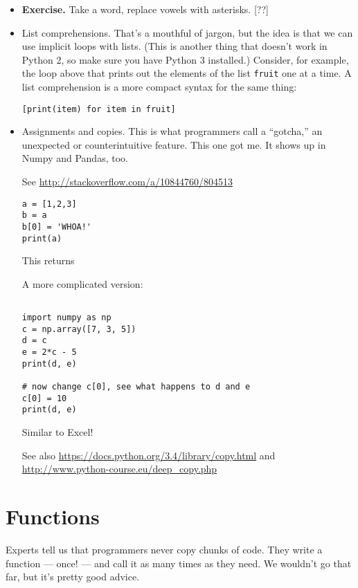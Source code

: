 \documentclass[11pt]{article}
\begin{document}
\begin{itemize}


\item {\bf Exercise.}
Take a word, replace vowels with asterisks. [??]


\item List comprehensions.
That's a mouthful of jargon, but the idea is that we can
use implicit loops with lists.
(This is another thing that doesn't work in Python 2, so make sure you have Python 3 installed.)
Consider, for example, the loop above that prints out the elements of the list {\tt fruit} one at a time.
A list comprehension is a more compact syntax for the same thing:
\begin{verbatim}
[print(item) for item in fruit]
\end{verbatim}


\item Assignments and copies.
This is what programmers call a ``gotcha,''
an unexpected or counterintuitive feature.
This one got me.
 It shows up in Numpy and Pandas, too.

See \url{http://stackoverflow.com/a/10844760/804513}

\begin{verbatim}
a = [1,2,3]
b = a
b[0] = 'WHOA!'
print(a)
\end{verbatim}
This returns

A more complicated version:
\begin{verbatim}

import numpy as np
c = np.array([7, 3, 5])
d = c
e = 2*c - 5
print(d, e)

# now change c[0], see what happens to d and e
c[0] = 10
print(d, e)
\end{verbatim}

Similar to Excel!

See also \url{https://docs.python.org/3.4/library/copy.html}
and \url{http://www.python-course.eu/deep_copy.php}

\end{itemize}

\section{Functions}



Experts tell us that programmers never copy chunks of code.
They write a function --- once! --- and call it as
many times as they need.
We wouldn't go that far, but it's pretty good advice.
\end{document}

